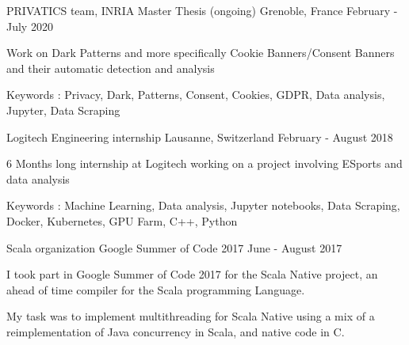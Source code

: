 


\begin{cventries}
	
\cventry
{PRIVATICS team, INRIA} %
{Master Thesis (ongoing)} %
{Grenoble, France} %
{February - July 2020} %
{ %
	\begin{cvitems}
		\item {Work on Dark Patterns and more specifically Cookie Banners/Consent Banners and their automatic detection and analysis}
		\item {Keywords : Privacy, Dark, Patterns, Consent, Cookies, GDPR, Data analysis, Jupyter, Data Scraping}
	\end{cvitems}
}
	

\cventry
{Logitech} %
{Engineering internship} %
{Lausanne, Switzerland} %
{February - August 2018} %
{ %
	\begin{cvitems}
		\item {6 Months long internship at Logitech working on a project involving ESports and data analysis}
		\item {Keywords : Machine Learning, Data analysis, Jupyter notebooks, Data Scraping, Docker, Kubernetes, GPU Farm, C++, Python}
	\end{cvitems}
}
	

\cventry
{Scala organization} %
{Google Summer of Code 2017} %
{} %
{June - August 2017} %
{ %
\begin{cvitems}
\item {I took part in Google Summer of Code 2017 for the Scala Native project, an ahead of time compiler for the Scala programming Language.}
\item {My task was to implement multithreading for Scala Native using a mix of a reimplementation of Java concurrency in Scala, and native code in C.}
\end{cvitems}
}


\end{cventries}
